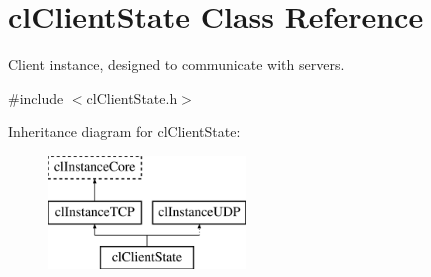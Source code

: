 \hypertarget{classcl_client_state}{
\section{clClientState Class Reference}
\label{classcl_client_state}
}


Client instance, designed to communicate with servers.  




{\ttfamily \#include $<$clClientState.h$>$}

Inheritance diagram for clClientState:\begin{figure}[H]
\begin{center}
\leavevmode
\includegraphics[height=3.000000cm]{classcl_client_state}
\end{center}
\end{figure}
